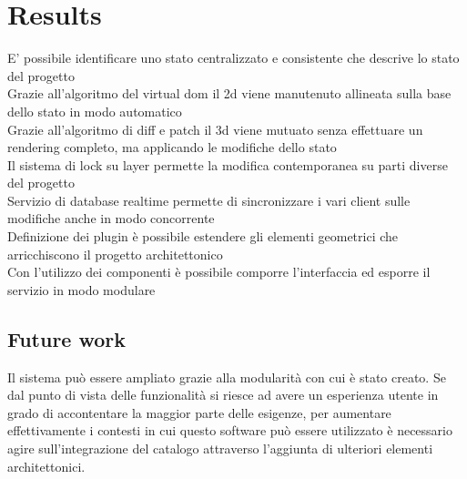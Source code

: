 \section{Results}


E' possibile identificare uno stato centralizzato e consistente che descrive lo stato del progetto\\
Grazie all'algoritmo del virtual dom il 2d viene manutenuto allineata sulla base dello stato in modo automatico\\
Grazie all'algoritmo di diff e patch il 3d viene mutuato senza effettuare un rendering completo, ma applicando le modifiche dello stato\\
Il sistema di lock su layer permette la modifica contemporanea su parti diverse del progetto\\
Servizio di database realtime permette di sincronizzare i vari client sulle modifiche anche in modo concorrente\\
Definizione dei plugin \`e possibile estendere gli elementi geometrici che arricchiscono il progetto architettonico\\
Con l'utilizzo dei componenti \`e possibile comporre l'interfaccia ed esporre il servizio in modo modulare\\



\subsection{Future work}
Il sistema pu\`o essere ampliato grazie alla modularit\`a con cui \`e stato creato. Se dal punto di vista delle funzionalit\`a si riesce ad avere un esperienza utente in grado di accontentare la maggior parte delle esigenze, per aumentare effettivamente i contesti in cui questo software pu\`o essere utilizzato \`e necessario agire sull'integrazione del catalogo attraverso l'aggiunta di ulteriori elementi architettonici.
